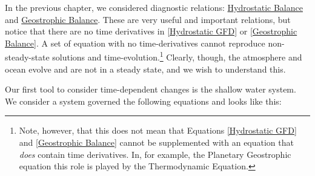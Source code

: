 In the previous chapter, we considered diagnostic relations: \hyperref[Hydrostatic GFD Box]{Hydrostatic Balance} and \hyperref[Geostrophic Box]{Geostrophic Balance}. These are very useful and important relations, but notice that there are no time derivatives in \ref{Hydrostatic GFD} or \ref{Geostrophic Balance}. A set of equation with no time-derivatives cannot reproduce non-steady-state solutions and time-evolution.\footnote{Note, however, that this does not mean that Equations \ref{Hydrostatic GFD} and \ref{Geostrophic Balance} cannot be supplemented with an equation that \textit{does} contain time derivatives. In, for example, the Planetary Geostrophic equation this role is played by the Thermodynamic Equation.} Clearly, though, the atmosphere and ocean evolve and are not in a steady state, and we wish to understand this.

Our first tool to consider time-dependent changes is the shallow water system. We consider a system governed the following equations and looks like this:

